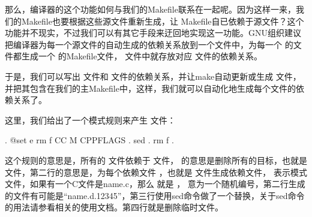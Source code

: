 \documentclass[a4paper,10pt]{sphinxmanual}
\begin{document}
那么，编译器的这个功能如何与我们的Makefile联系在一起呢。因为这样一来，我们的Makefile也要根据这些源文件重新生成，让 Makefile自已依赖于源文件？这个功能并不现实，不过我们可以有其它手段来迂回地实现这一功能。GNU组织建议把编译器为每一个源文件的自动生成的依赖关系放到一个文件中，为每一个  的文件都生成一个  的Makefile文件，  文件中就存放对应
 文件的依赖关系。

于是，我们可以写出  文件和  文件的依赖关系，并让make自动更新或生成 
文件，并把其包含在我们的主Makefile中，这样，我们就可以自动化地生成每个文件的依赖关系了。

这里，我们给出了一个模式规则来产生  文件：

\begin{sphinxVerbatim}[commandchars=\\\{\}]
 \PYGZpc{}.
    @set \PYGZhy{}e rm \PYGZhy{}f  
    CC \PYGZhy{}M CPPFLAGS \PYGZdl{}\PYGZlt{} \PYGZgt{} . 
    sed  \PYGZlt{} . \PYGZgt{}  
    rm \PYGZhy{}f .
\end{sphinxVerbatim}

这个规则的意思是，所有的  文件依赖于  文件，  的意思是删除所有的目标，也就是  文件，第二行的意思是，为每个依赖文件 \sphinxcode{\sphinxupquote{\$\textless{}}} ，也就是  文件生成依赖文件，  表示模式  文件，如果有一个C文件是name.c，那么 \sphinxcode{\sphinxupquote{\%}} 就是
 ， \sphinxcode{\sphinxupquote{\$\$\$\$}} 意为一个随机编号，第二行生成的文件有可能是“name.d.12345”，第三行使用sed命令做了一个替换，关于sed命令的用法请参看相关的使用文档。第四行就是删除临时文件。
\end{document}
